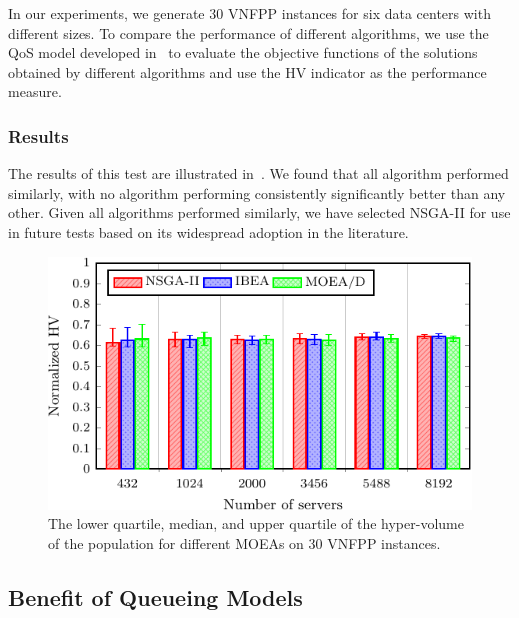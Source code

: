 In our experiments, we generate $30$ VNFPP instances for six data centers with different sizes. To compare the performance of different algorithms, we use the QoS model developed in~ to evaluate the objective functions of the solutions obtained by different algorithms and use the HV indicator as the performance measure.

\subsubsection{Results}
The results of this test are illustrated in~. We found that all algorithm performed similarly, with no algorithm performing consistently significantly better than any other. Given all algorithms performed similarly, we have selected NSGA-II for use in future tests based on its widespread adoption in the literature. 

\begin{figure}[t!]
    \centering
    \includegraphics[width=\columnwidth]{graphs/moeas/comparison-crop}
    \caption{The lower quartile, median, and upper quartile of the hyper-volume of the population for different MOEAs on 30 VNFPP instances.}
    \label{fig:moea_comparison}
\end{figure}

\vspace{0.5em}
\noindent
{}

\subsection{Benefit of Queueing Models}
\label{sec:model_benefit}

